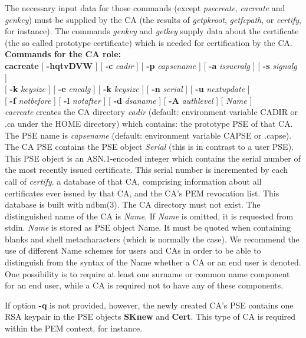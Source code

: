 The necessary input data for those commands (except {\em psecreate}, {\em cacreate} and {\em genkey}) 
must be
supplied by the CA (the results of {\em getpkroot}, {\em getfcpath}, or {\em certify}, for instance). 
The commands {\em genkey} and {\em getkey} supply data about the certificate (the so called prototype 
certificate)
which is needed for certification by the CA. 
\\ [1em]
{\bf Commands for the CA role:} 
\\ [1em]
{\bf cacreate} [ {\bf -hqtvDVW} ] [ {\bf -c} {\em cadir} ] [ {\bf -p} {\em capsename} ] [ {\bf -a} {\em issueralg} ]
[ {\bf -s} {\em signalg} ] 
\\ \hspace*{2cm} [ {\bf -k} {\em keysize} ] [ {\bf -e} {\em encalg} ] [ {\bf -k} {\em keysize} ]
[ {\bf -n} {\em serial} ] [ {\bf -u} {\em nextupdate} ] 
\\ \hspace*{2cm} [ {\bf -f} {\em notbefore} ] [ {\bf -l} {\em notafter} ] [ {\bf -d} {\em dsaname} ] [ {\bf -A} {\em authlevel} ] [ {\em Name} ]
\\ [1em]
{\em cacreate} creates the CA directory {\em cadir} (default: environment variable CADIR or .ca 
under the HOME directory)
which contains:
\bi
\m the prototype PSE of that CA. The PSE name is {\em capsename} (default: environment variable CAPSE or .capse). 
The CA
   PSE contains the PSE object {\em Serial} (this is in contrast to a user PSE). This PSE object 
   is an ASN.1-encoded integer which contains the serial 
   number of the most recently issued certificate.
   This serial number is incremented by each call of {\em certify}.
\m a database of that CA, comprising information about all certificates
   ever issued by that CA, and the CA's PEM revocation list. This database is built with 
ndbm(3).
\ei
The CA directory must not exist. 
The distinguished name of the CA is {\em Name}. 
If {\em Name} is omitted, it is requested from 
stdin. {\em Name} is stored as PSE object Name. 
It must be quoted when containing blanks and shell metacharacters (which is normally the case).
We recommend the use of different Name schemes for users and CAs in order to be 
able to distinguish from the syntax of the Name whether a CA or an end user is denoted.
One possibility is to require at least one surname or common name component
for an end user, while a CA is required not to have any of these components. 
 
If option {\bf -q} is not provided, however, the newly created CA's PSE contains one RSA keypair in the PSE 
objects {\bf SKnew} and {\bf Cert}. This type of CA is required within the PEM context, for instance.

